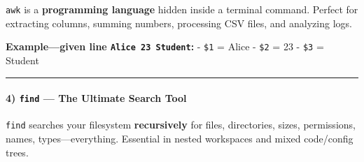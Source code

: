\documentclass[
  english,
  paper=a4,
  oneside  ,captions=tableheading
]{scrartcl}
\newenvironment{Shaded}{}{}
\newcommand{\AttributeTok}[1]{\textcolor[rgb]{0.49,0.56,0.16}{#1}}
\newcommand{\CommentTok}[1]{\textcolor[rgb]{0.38,0.63,0.69}{\textit{#1}}}
\newcommand{\FunctionTok}[1]{\textcolor[rgb]{0.02,0.16,0.49}{#1}}
\newcommand{\NormalTok}[1]{#1}
\newcommand{\StringTok}[1]{\textcolor[rgb]{0.25,0.44,0.63}{#1}}
\begin{document}
\texttt{awk} is a \textbf{programming language} hidden inside a terminal
command. Perfect for extracting columns, summing numbers, processing CSV
files, and analyzing logs.

\begin{Shaded}
\end{Shaded}

\textbf{Example---given line \texttt{Alice\ 23\ Student}:} -
\texttt{\$1} = Alice - \texttt{\$2} = 23 - \texttt{\$3} = Student

\begin{center}\rule{0.5\linewidth}{0.5pt}\end{center}

\paragraph{\texorpdfstring{4) \texttt{find} --- The Ultimate Search
Tool}{4) find --- The Ultimate Search Tool}}\label{find-the-ultimate-search-tool}

\texttt{find} searches your filesystem \textbf{recursively} for files,
directories, sizes, permissions, names, types---everything. Essential in
nested workspaces and mixed code/config trees.
\end{document}
